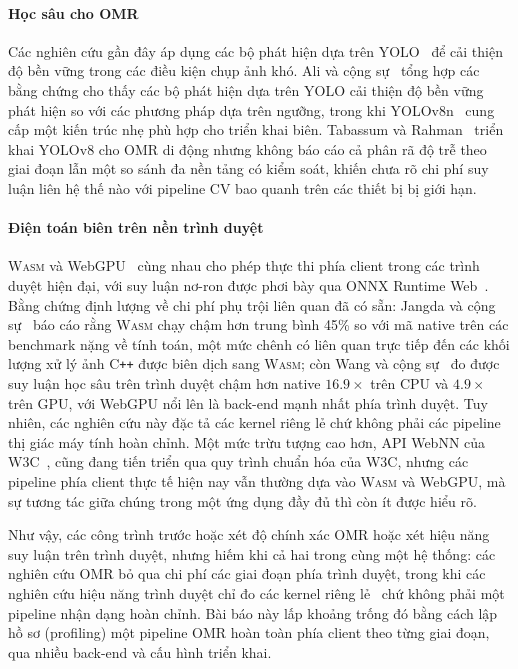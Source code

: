 \documentclass[conference]{IEEEtran}
\newcommand{\wasm}{\textnormal{\textsc{Wasm}}}
\begin{document}
\paragraph{Học sâu cho OMR}
Các nghiên cứu gần đây áp dụng các bộ phát hiện dựa trên
YOLO~\cite{redmon2016} để cải thiện độ bền vững trong các điều kiện chụp ảnh khó.
Ali và cộng sự~\cite{ali2025} tổng hợp các bằng chứng cho thấy các bộ phát hiện
dựa trên YOLO cải thiện độ bền vững phát hiện so với các phương pháp dựa trên
ngưỡng, trong khi YOLOv8n~\cite{jocher2023} cung cấp một kiến trúc nhẹ phù hợp cho
triển khai biên. Tabassum và Rahman~\cite{tabassum2024} triển khai YOLOv8 cho OMR
di động nhưng không báo cáo cả phân rã độ trễ theo giai đoạn lẫn một so sánh đa
nền tảng có kiểm soát, khiến chưa rõ chi phí suy luận liên hệ thế nào với pipeline
CV bao quanh trên các thiết bị bị giới hạn.

\paragraph{Điện toán biên trên nền trình duyệt}
\wasm{} và WebGPU~\cite{webgpu2025} cùng nhau cho phép thực thi phía client trong
các trình duyệt hiện đại, với suy luận nơ-ron được phơi bày qua ONNX Runtime
Web~\cite{microsoft2021}. Bằng chứng định lượng về chi phí phụ trội liên quan đã
có sẵn: Jangda và cộng sự~\cite{jangda2019} báo cáo rằng \wasm{} chạy chậm hơn
trung bình 45\% so với mã native trên các benchmark nặng về tính toán, một mức
chênh có liên quan trực tiếp đến các khối lượng xử lý ảnh C\texttt{++} được biên
dịch sang \wasm{}; còn Wang và cộng sự~\cite{wang2024} đo được suy luận học sâu
trên trình duyệt chậm hơn native $16.9\times$ trên CPU và $4.9\times$ trên GPU,
với WebGPU nổi lên là back-end mạnh nhất phía trình duyệt. Tuy nhiên, các nghiên
cứu này đặc tả các kernel riêng lẻ chứ không phải các pipeline thị giác máy tính
hoàn chỉnh. Một mức trừu tượng cao hơn, API WebNN của W3C~\cite{webnn2026}, cũng
đang tiến triển qua quy trình chuẩn hóa của W3C, nhưng các pipeline phía client
thực tế hiện nay vẫn thường dựa vào \wasm{} và WebGPU, mà sự tương tác giữa chúng
trong một ứng dụng đầy đủ thì còn ít được hiểu rõ.

Như vậy, các công trình trước hoặc xét độ chính xác OMR hoặc xét hiệu năng suy
luận trên trình duyệt, nhưng hiếm khi cả hai trong cùng một hệ thống: các nghiên
cứu OMR bỏ qua chi phí các giai đoạn phía trình duyệt, trong khi các nghiên cứu
hiệu năng trình duyệt chỉ đo các kernel riêng lẻ~\cite{jangda2019,wang2024} chứ
không phải một pipeline nhận dạng hoàn chỉnh. Bài báo này lấp khoảng trống đó bằng
cách lập hồ sơ (profiling) một pipeline OMR hoàn toàn phía client theo từng giai
đoạn, qua nhiều back-end và cấu hình triển khai.
\end{document}
